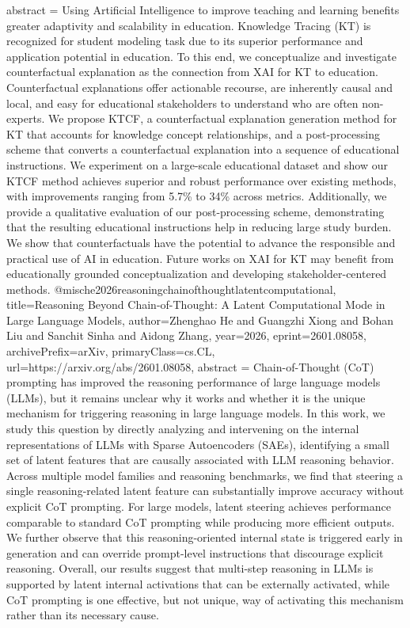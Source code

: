 {      abstract = {Using Artificial Intelligence to improve teaching and learning benefits greater adaptivity and scalability in education. Knowledge Tracing (KT) is recognized for student modeling task due to its superior performance and application potential in education. To this end, we conceptualize and investigate counterfactual explanation as the connection from XAI for KT to education. Counterfactual explanations offer actionable recourse, are inherently causal and local, and easy for educational stakeholders to understand who are often non-experts. We propose KTCF, a counterfactual explanation generation method for KT that accounts for knowledge concept relationships, and a post-processing scheme that converts a counterfactual explanation into a sequence of educational instructions. We experiment on a large-scale educational dataset and show our KTCF method achieves superior and robust performance over existing methods, with improvements ranging from 5.7\% to 34\% across metrics. Additionally, we provide a qualitative evaluation of our post-processing scheme, demonstrating that the resulting educational instructions help in reducing large study burden. We show that counterfactuals have the potential to advance the responsible and practical use of AI in education. Future works on XAI for KT may benefit from educationally grounded conceptualization and developing stakeholder-centered methods.}
}@misc{he2026reasoningchainofthoughtlatentcomputational,
      title={Reasoning Beyond Chain-of-Thought: A Latent Computational Mode in Large Language Models}, 
      author={Zhenghao He and Guangzhi Xiong and Bohan Liu and Sanchit Sinha and Aidong Zhang},
      year={2026},
      eprint={2601.08058},
      archivePrefix={arXiv},
      primaryClass={cs.CL},
      url={https://arxiv.org/abs/2601.08058},
      abstract = {Chain-of-Thought (CoT) prompting has improved the reasoning performance of large language models (LLMs), but it remains unclear why it works and whether it is the unique mechanism for triggering reasoning in large language models. In this work, we study this question by directly analyzing and intervening on the internal representations of LLMs with Sparse Autoencoders (SAEs), identifying a small set of latent features that are causally associated with LLM reasoning behavior. Across multiple model families and reasoning benchmarks, we find that steering a single reasoning-related latent feature can substantially improve accuracy without explicit CoT prompting. For large models, latent steering achieves performance comparable to standard CoT prompting while producing more efficient outputs. We further observe that this reasoning-oriented internal state is triggered early in generation and can override prompt-level instructions that discourage explicit reasoning. Overall, our results suggest that multi-step reasoning in LLMs is supported by latent internal activations that can be externally activated, while CoT prompting is one effective, but not unique, way of activating this mechanism rather than its necessary cause.}
}
